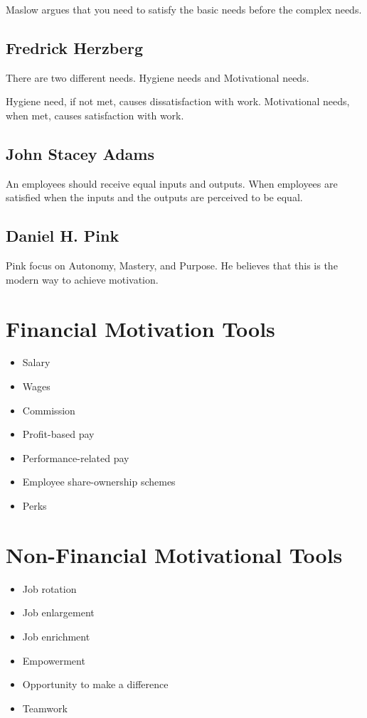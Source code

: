 \documentclass{report}
\begin{document}
Maslow argues that you need to satisfy the basic needs before the complex needs.

\subsection{Fredrick Herzberg}
There are two different needs.
Hygiene needs and Motivational needs.

Hygiene need, if not met, causes dissatisfaction with work.
Motivational needs, when met, causes satisfaction with work.

\subsection{John Stacey Adams}
An employees should receive equal inputs and outputs.
When employees are satisfied when the inputs and the outputs are perceived to be equal.

\subsection{Daniel H. Pink}
Pink focus on Autonomy, Mastery, and Purpose.
He believes that this is the modern way to achieve motivation.

\section{Financial Motivation Tools}
\begin{itemize}
	\item Salary
	\item Wages
	\item Commission
	\item Profit-based pay
	\item Performance-related pay
	\item Employee share-ownership schemes
	\item Perks
\end{itemize}

\section{Non-Financial Motivational Tools}
\begin{itemize}
	\item Job rotation
	\item Job enlargement
	\item Job enrichment
	\item Empowerment
	\item Opportunity to make a difference
	\item Teamwork
\end{itemize}
\end{document}
